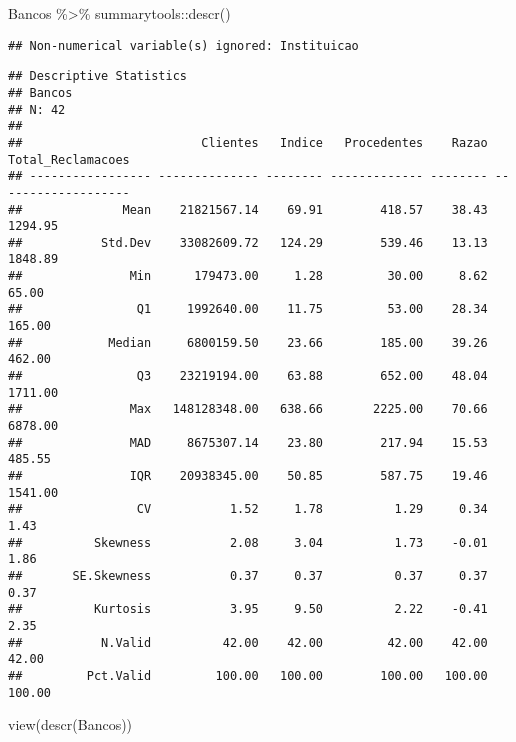 \documentclass[
]{article}
\newenvironment{Shaded}{\begin{snugshade}}{\end{snugshade}}
\newcommand{\FunctionTok}[1]{\textcolor[rgb]{0.00,0.00,0.00}{#1}}
\newcommand{\NormalTok}[1]{#1}
\newcommand{\SpecialCharTok}[1]{\textcolor[rgb]{0.00,0.00,0.00}{#1}}
\begin{document}
\begin{Shaded}
\begin{Highlighting}[]
\NormalTok{Bancos  }\SpecialCharTok{\%\textgreater{}\%}\NormalTok{ summarytools}\SpecialCharTok{::}\FunctionTok{descr}\NormalTok{()}
\end{Highlighting}
\end{Shaded}

\begin{verbatim}
## Non-numerical variable(s) ignored: Instituicao
\end{verbatim}

\begin{verbatim}
## Descriptive Statistics  
## Bancos  
## N: 42  
## 
##                         Clientes   Indice   Procedentes    Razao   Total_Reclamacoes
## ----------------- -------------- -------- ------------- -------- -------------------
##              Mean    21821567.14    69.91        418.57    38.43             1294.95
##           Std.Dev    33082609.72   124.29        539.46    13.13             1848.89
##               Min      179473.00     1.28         30.00     8.62               65.00
##                Q1     1992640.00    11.75         53.00    28.34              165.00
##            Median     6800159.50    23.66        185.00    39.26              462.00
##                Q3    23219194.00    63.88        652.00    48.04             1711.00
##               Max   148128348.00   638.66       2225.00    70.66             6878.00
##               MAD     8675307.14    23.80        217.94    15.53              485.55
##               IQR    20938345.00    50.85        587.75    19.46             1541.00
##                CV           1.52     1.78          1.29     0.34                1.43
##          Skewness           2.08     3.04          1.73    -0.01                1.86
##       SE.Skewness           0.37     0.37          0.37     0.37                0.37
##          Kurtosis           3.95     9.50          2.22    -0.41                2.35
##           N.Valid          42.00    42.00         42.00    42.00               42.00
##         Pct.Valid         100.00   100.00        100.00   100.00              100.00
\end{verbatim}

\begin{Shaded}
\begin{Highlighting}[]
\FunctionTok{view}\NormalTok{(}\FunctionTok{descr}\NormalTok{(Bancos))}
\end{Highlighting}
\end{Shaded}
\end{document}
